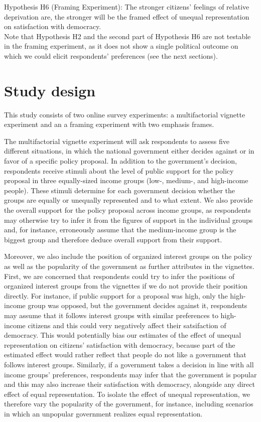 \documentclass[12pt, letterpaper]{article}
\begin{document}
\begin{spacing}{1.5}
Hypothesis H6 (Framing Experiment): The stronger citizens' feelings of relative deprivation are, the stronger will be the framed effect of unequal representation on satisfaction with democracy.\\

Note that Hypothesis H2 and the second part of Hypothesis H6 are not testable in the framing experiment, as it does not show a single political outcome on which we could elicit respondents' preferences (see the next sections).\\

\section*{Study design}

This study consists of two online survey experiments: a multifactorial vignette experiment and an a framing experiment with two emphasis frames.

The multifactorial vignette experiment will ask respondents to assess five different situations, in which the national government either decides against or in favor of a specific policy proposal. In addition to the government's decision, respondents receive stimuli about the level of public support for the policy proposal in three equally-sized income groups (low-, medium-, and high-income people). These stimuli determine for each government decision whether the groups are equally or unequally represented and to what extent. We also provide the overall support for the policy proposal across income groups, as respondents may otherwise try to infer it from the figures of support in the individual groups and, for instance, erroneously assume that the medium-income group is the biggest group and therefore deduce overall support from their support.

Moreover, we also include the position of organized interest groups on the policy as well as the popularity of the government as further attributes in the vignettes. First, we are concerned that respondents could try to infer the positions of organized interest groups from the vignettes if we do not provide their position directly. For instance, if public support for a proposal was high, only the high-income group was opposed, but the government decides against it, respondents may assume that it follows interest groups with similar preferences to high-income citizens and this could very negatively affect their satsifaction of democracy. This would potentially bias our estimates of the effect of unequal representation on citizens' satisfaction with democracy, because part of the estimated effect would rather reflect that people do not like a government that follows interest groups. Similarly, if a government takes a decision in line with all income groups' preferences, respondents may infer that the government is popular and this may also increase their satisfaction with democracy, alongside any direct effect of equal representation. To isolate the effect of unequal representation, we therefore vary the popularity of the government, for instance, including scenarios in which an unpopular government realizes equal representation.


\end{spacing}
\end{document}
